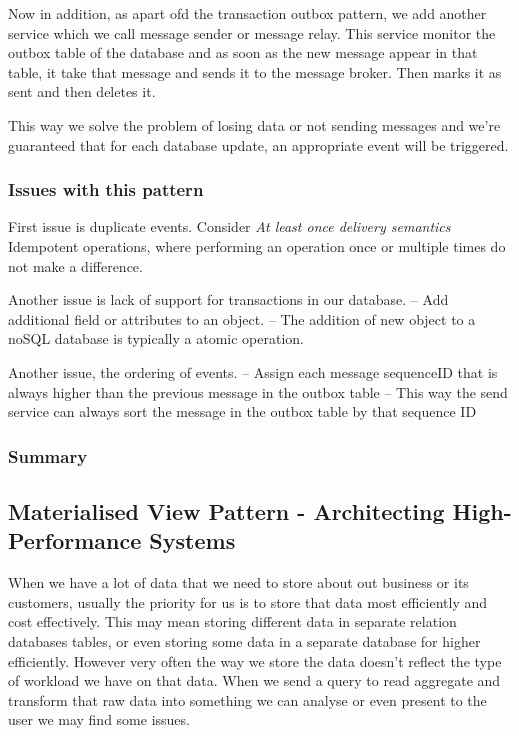 Now in addition, as apart ofd the transaction outbox pattern, we add another service which we call message sender or message relay.
This service monitor the outbox table of the database and as soon as the new message appear in that table, it take that message and sends it to the message broker.
Then marks it as sent and then deletes it.

This way we solve the problem of losing data or not sending messages and we're guaranteed that for each database update, an appropriate event will be triggered.

\subsubsection{Issues with this pattern}
First issue is duplicate events.
Consider \textit{At least once delivery semantics}
Idempotent operations, where performing an operation once or multiple times do not make a difference.

Another issue is lack of support for transactions in our database.
-- Add additional field or attributes to an object.
-- The addition of new object to a noSQL database is typically a atomic operation.

Another issue, the ordering of events.
-- Assign each message sequenceID that is always higher than the previous message in the outbox table
-- This way the send service can always sort the message in the outbox table by that sequence ID

\subsubsection{Summary}

\subsection{Materialised View Pattern - Architecting High-Performance Systems}
When we have a lot of data that we need to store about out business or its customers, usually the priority for us is to store that data most efficiently and cost effectively.
This may mean storing different data in separate relation databases tables, or even storing some data in a separate database for higher efficiently.
However very often the way we store the data doesn't reflect the type of workload we have on that data.
When we send a query to read aggregate and transform that raw data into something we can analyse or even present to the user we may find some issues.

